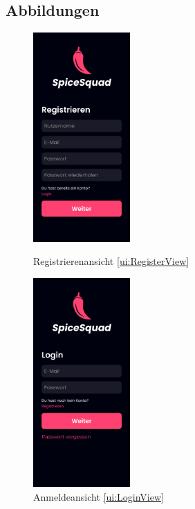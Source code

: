 \documentclass[parskip=full]{scrartcl}
\begin{document}
\subsection*{Abbildungen}
\begin{figure}[htp]
    \begin{minipage}
        [t]{0.49\textwidth}
        \centering
        \includegraphics[height=80mm]{images/ui/RegisterView.jpg}
        \caption{Registrierenansicht \ref{ui:RegisterView}}
        \label{fig:RegisterView}
    \end{minipage}
    \begin{minipage}
        [t]{0.49\textwidth}
        \centering
        \includegraphics[height=80mm]{images/ui/LoginView.jpg}
        \caption{Anmeldeansicht \ref{ui:LoginView}}
        \label{fig:LoginView}
    \end{minipage}
\end{figure}
\end{document}
